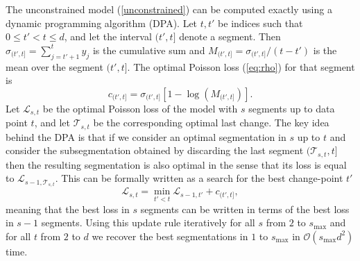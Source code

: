 \documentclass{article}
\begin{document}
The unconstrained model (\ref{unconstrained}) can be computed exactly
using a dynamic programming algorithm (DPA).
Let $t,t'$ be indices such that $0\leq t' < t \leq d$, and let the
interval $(t', t]$ denote a segment. Then $\sigma_{(t', t]} =
\sum_{j=t'+1}^t y_j$ is the cumulative sum and $M_{(t', t]} =
\sigma_{(t', t]}/(t-t')$ is the mean over the segment $(t', t]$. The
optimal Poisson loss (\ref{eq:rho}) for that segment is
\begin{equation}
  \label{eq:log-lik-segment}
  c_{(t',t]} = \sigma_{(t', t]}\left[1 - 
  \log\left(M_{(t', t]}\right)\right].
\end{equation}
Let ${\mathcal L}_{s, t}$ be the optimal Poisson loss of the model
with $s$ segments up to data point $t$, and let ${\mathcal T}_{s, t}$
be the corresponding optimal last change. The key idea behind the DPA
is that if we consider an optimal segmentation in $s$ up to $t$ and
consider the subsegmentation obtained by discarding the last segment
$({\mathcal T}_{s, t}, t]$ then the resulting segmentation is also
optimal in the sense that its loss is equal to ${\mathcal L}_{s-1,
  {\mathcal T}_{s, t}}.$
This can be formally written as a search for the best
change-point $t'$
\begin{equation}
{\mathcal{L}}_{s,t}= \min_{t' < t}
{\mathcal{L}}_{s-1,t'} +
 c_{(t',t]}, 
 \label{eq:update1}
\end{equation}
meaning that the best loss in $s$ segments can be written in terms of
the best loss in $s-1$ segments. Using this update
rule iteratively for all $s$ from $2$ to $s_{\text{max}}$ and for all
$t$ from $2$ to $d$ we recover the best segmentations in $1$ to
$s_{\text{max}}$ in $\mathcal{O}(s_{\text{max}}d^2)$ time.

\end{document}
